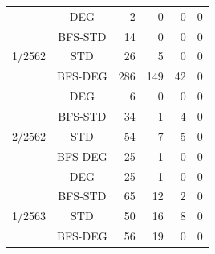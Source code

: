\begin{table}[]
\begin{tabular}{@{}ccrrrr@{}}
                                  & {\color[HTML]{FE0000} DEG} & {\color[HTML]{FE0000} 2}  & {\color[HTML]{FE0000} 0} & {\color[HTML]{FE0000} 0} & {\color[HTML]{FE0000} 0} \\ \cmidrule(l){2-6} 
                                  & BFS-STD                    & 14                        & 0                        & 0                        & 0                        \\ \cmidrule(l){2-6} 
    \multirow{-4}{*}{1/2562}      & STD                        & 26                        & 5                        & 0                        & 0                        \\ \midrule
                                  & BFS-DEG                    & 286                       & 149                      & 42                       & 0                        \\ \cmidrule(l){2-6} 
                                  & {\color[HTML]{FE0000} DEG} & {\color[HTML]{FE0000} 6}  & {\color[HTML]{FE0000} 0} & {\color[HTML]{FE0000} 0} & {\color[HTML]{FE0000} 0} \\ \cmidrule(l){2-6} 
                                  & BFS-STD                    & 34                        & 1                        & 4                        & 0                        \\ \cmidrule(l){2-6} 
    \multirow{-4}{*}{2/2562}      & STD                        & 54                        & 7                        & 5                        & 0                        \\ \midrule
                                  & BFS-DEG                    & 25                        & 1                        & 0                        & 0                        \\ \cmidrule(l){2-6} 
                                  & {\color[HTML]{FE0000} DEG} & {\color[HTML]{FE0000} 25} & {\color[HTML]{FE0000} 1} & {\color[HTML]{FE0000} 0} & {\color[HTML]{FE0000} 0} \\ \cmidrule(l){2-6} 
                                  & BFS-STD                    & 65                        & 12                       & 2                        & 0                        \\ \cmidrule(l){2-6} 
    \multirow{-4}{*}{1/2563}      & STD                        & 50                        & 16                       & 8                        & 0                        \\ \midrule
                                  & BFS-DEG                    & 56                        & 19                       & 0                        & 0                        \\ \cmidrule(l){2-6} 

\end{tabular}
\end{table}

